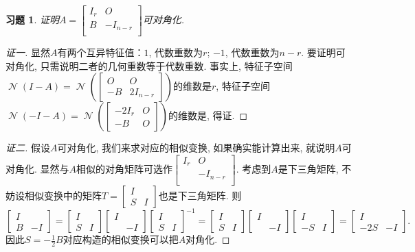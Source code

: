 \documentclass{ctexart}
\newtheorem{exercise}[thm]{习题}
\def\zero{O}
\DeclareMathOperator{\nullspace}{\mathcal{N}}
\begin{document}
\begin{exercise}
证明$A=\begin{bmatrix}
I_r & \zero \\ B & -I_{n-r} \\
\end{bmatrix}$可对角化. 
\end{exercise}
\begin{proof}[证一]
	显然$A$有两个互异特征值：$1$, 代数重数为$r$; $-1$, 代数重数为$n-r$. 
	要证明可对角化, 只需说明二者的几何重数等于代数重数. 事实上, 特征子空间$\nullspace(I-A)=\nullspace\left( \begin{bmatrix}
			\zero & \zero \\ -B & 2I_{n-r}
	\end{bmatrix} \right)$的维数是$r$, 特征子空间$\nullspace(-I-A)=\nullspace\left( \begin{bmatrix}
			-2I_r & \zero \\ -B & \zero
	\end{bmatrix} \right)$的维数是, 得证. 
\end{proof}
\begin{proof}[证二]
	假设$A$可对角化, 我们来求对应的相似变换, 如果确实能计算出来, 就说明$A$可对角化. 显然与$A$相似的对角矩阵可选作$\begin{bmatrix}
I_r & \zero \\  & -I_{n-r} \\
	\end{bmatrix} $. 
	考虑到$A$是下三角矩阵, 不妨设相似变换中的矩阵$T=\begin{bmatrix}
		I & \\ S & I
	\end{bmatrix}$也是下三角矩阵. 则
	\[
		\begin{bmatrix}
	I & \\ B & -I
	\end{bmatrix}=\begin{bmatrix}
	I & \\ S & I
	\end{bmatrix}\begin{bmatrix}
		 I & \\ & -I 
	\end{bmatrix}\begin{bmatrix}
		 I & \\ S & I
	 \end{bmatrix}^{-1}=\begin{bmatrix}
	I & \\ S & I
	\end{bmatrix}\begin{bmatrix}
		 I & \\ & -I 
	\end{bmatrix}\begin{bmatrix}
		 I & \\ -S & I
	 \end{bmatrix}=\begin{bmatrix}
	 I & \\ -2S & -I
	 \end{bmatrix}.
	\]因此$S=-\frac{1}{2}B$对应构造的相似变换可以把$A$对角化. 
\end{proof}
\end{document}
